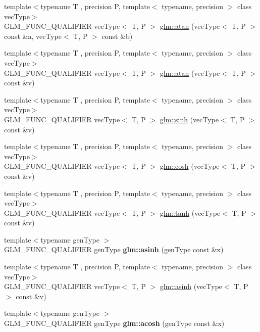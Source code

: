 \begin{DoxyCompactItemize}
\item 
{\footnotesize template$<$typename T , precision P, template$<$ typename, precision $>$ class vec\-Type$>$ }\\G\-L\-M\-\_\-\-F\-U\-N\-C\-\_\-\-Q\-U\-A\-L\-I\-F\-I\-E\-R vec\-Type$<$ T, P $>$ \hyperlink{group__core__func__trigonometric_ga461e769acb8b8cb695a5a89334546611}{glm\-::atan} (vec\-Type$<$ T, P $>$ const \&a, vec\-Type$<$ T, P $>$ const \&b)
\item 
{\footnotesize template$<$typename T , precision P, template$<$ typename, precision $>$ class vec\-Type$>$ }\\G\-L\-M\-\_\-\-F\-U\-N\-C\-\_\-\-Q\-U\-A\-L\-I\-F\-I\-E\-R vec\-Type$<$ T, P $>$ \hyperlink{group__core__func__trigonometric_gae8f22458bba8f2321ceb1bfc4a543216}{glm\-::atan} (vec\-Type$<$ T, P $>$ const \&v)
\item 
{\footnotesize template$<$typename T , precision P, template$<$ typename, precision $>$ class vec\-Type$>$ }\\G\-L\-M\-\_\-\-F\-U\-N\-C\-\_\-\-Q\-U\-A\-L\-I\-F\-I\-E\-R vec\-Type$<$ T, P $>$ \hyperlink{group__core__func__trigonometric_gad8f89c12efe6f8d3ae8046625b266254}{glm\-::sinh} (vec\-Type$<$ T, P $>$ const \&v)
\item 
{\footnotesize template$<$typename T , precision P, template$<$ typename, precision $>$ class vec\-Type$>$ }\\G\-L\-M\-\_\-\-F\-U\-N\-C\-\_\-\-Q\-U\-A\-L\-I\-F\-I\-E\-R vec\-Type$<$ T, P $>$ \hyperlink{group__core__func__trigonometric_ga660582a4e5e843b6c1cd535777e8c295}{glm\-::cosh} (vec\-Type$<$ T, P $>$ const \&v)
\item 
{\footnotesize template$<$typename T , precision P, template$<$ typename, precision $>$ class vec\-Type$>$ }\\G\-L\-M\-\_\-\-F\-U\-N\-C\-\_\-\-Q\-U\-A\-L\-I\-F\-I\-E\-R vec\-Type$<$ T, P $>$ \hyperlink{group__core__func__trigonometric_ga234e904a0075f88654a594b5f837711f}{glm\-::tanh} (vec\-Type$<$ T, P $>$ const \&v)
\item 
\hypertarget{namespaceglm_a57a36c99a445dbc760f3fa78cebfef6d}{{\footnotesize template$<$typename gen\-Type $>$ }\\G\-L\-M\-\_\-\-F\-U\-N\-C\-\_\-\-Q\-U\-A\-L\-I\-F\-I\-E\-R gen\-Type {\bfseries glm\-::asinh} (gen\-Type const \&x)}\label{namespaceglm_a57a36c99a445dbc760f3fa78cebfef6d}

\item 
{\footnotesize template$<$typename T , precision P, template$<$ typename, precision $>$ class vec\-Type$>$ }\\G\-L\-M\-\_\-\-F\-U\-N\-C\-\_\-\-Q\-U\-A\-L\-I\-F\-I\-E\-R vec\-Type$<$ T, P $>$ \hyperlink{group__core__func__trigonometric_ga72bf44c1984e1afb63acf821ba33cac7}{glm\-::asinh} (vec\-Type$<$ T, P $>$ const \&v)
\item 
\hypertarget{namespaceglm_a1812d9f93b0d9a4baa2462ae87b280c3}{{\footnotesize template$<$typename gen\-Type $>$ }\\G\-L\-M\-\_\-\-F\-U\-N\-C\-\_\-\-Q\-U\-A\-L\-I\-F\-I\-E\-R gen\-Type {\bfseries glm\-::acosh} (gen\-Type const \&x)}\label{namespaceglm_a1812d9f93b0d9a4baa2462ae87b280c3}


\end{DoxyCompactItemize}
